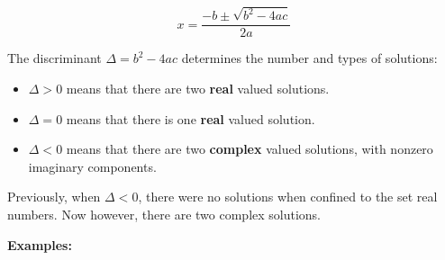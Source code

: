 \documentclass{article}
\begin{document}
\[x = \frac{-b \pm \sqrt{b^2 - 4ac}}{2a}\]

The discriminant \(\Delta = b^2 - 4ac\) determines the number and types of solutions:
\begin{itemize}
\item \(\Delta > 0\) means that there are two {\bf real} valued solutions. 
\item \(\Delta = 0\) means that there is one {\bf real} valued solution. 
\item \(\Delta < 0\) means that there are two {\bf complex} valued solutions, with nonzero imaginary components.
\end{itemize}
Previously, when \(\Delta < 0\), there were no solutions when confined to the set real numbers. Now however, there are two complex solutions.


\textbf{Examples:}
\end{document}
